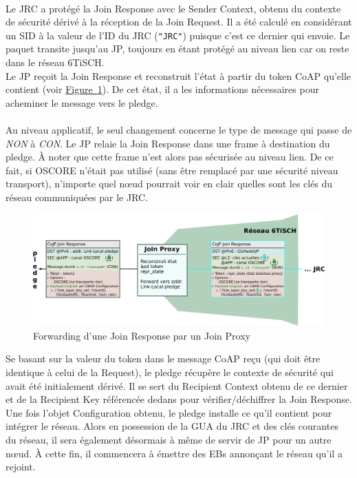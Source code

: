 \documentclass[]{report}
\newcommand{\minit}[1]{\noindent{\small\textbf{ \underline{#1}}}~\\}
\newcommand{\wordlink}[2]{\hyperref[#2]{#1~\ref{#2}}}
\begin{document}
\minit{JRC $\rightarrow$ JP (Join Response)}

Le JRC a protégé la Join Response avec le Sender Context, obtenu du contexte de sécurité dérivé à la réception de la Join Request. Il a été calculé en considérant un SID à la valeur de l'ID du JRC (\texttt{"JRC"}) puisque c'est ce dernier qui envoie. Le paquet transite jusqu'au JP, toujours en étant protégé au niveau lien car on reste dans le réseau 6TiSCH.\\

Le JP reçoit la Join Response et reconstruit l'état à partir du token CoAP qu'elle contient (voir \wordlink{Figure}{fig:join_response}). De cet état, il a les informations nécessaires pour acheminer le message vers le pledge.\\


\minit{JP $\rightarrow$ JRC (Join Response)}

 Au niveau applicatif, le seul changement concerne le type de message qui passe de \textit{NON} à \textit{CON}. Le JP relaie la Join Response dans une frame à destination du pledge. À noter que cette frame n'est alors pas sécurisée au niveau lien. De ce fait, si OSCORE n'était pas utilisé (sans être remplacé par une sécurité niveau transport), n'importe quel nœud pourrait voir en clair quelles sont les clés du réseau communiquées par le JRC. \\

\newpage


\vspace{0.2cm}
	\begin{figure}[!h]
	\centering
	\includegraphics[width=\linewidth]{Join_Response}
	\caption{Forwarding d'une Join Response par un Join Proxy}
	\label{fig:join_response}
	\end{figure}
\vspace{0.2cm}

Se basant sur la valeur du token dans le message CoAP reçu (qui doit être identique à celui de la Request), le pledge récupère le contexte de sécurité qui avait été initialement dérivé. Il se sert du Recipient Context obtenu de ce dernier et de la Recipient Key référencée dedans pour vérifier/déchiffrer la Join Response. Une fois l'objet Configuration obtenu, le pledge installe ce qu'il contient pour intégrer le réseau. Alors en possession de la GUA du JRC et des clés courantes du réseau, il sera également désormais à même de servir de JP pour un autre nœud. À cette fin, il commencera à émettre des EBs annonçant le réseau qu'il a rejoint.
\end{document}
